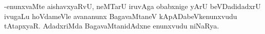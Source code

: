 -enunxvaMte aishavxyaRvU, neMTarU iruvAga obabxnige yArU beVDadidadxrU ivugaLu hoVdameVle avananunx BagavaMtaneV kApADabeVkenunxvudu tAtapxyaR. AdadxriMda BagavaMtanidAdxne enunxvudu niNaRya.


















































































































